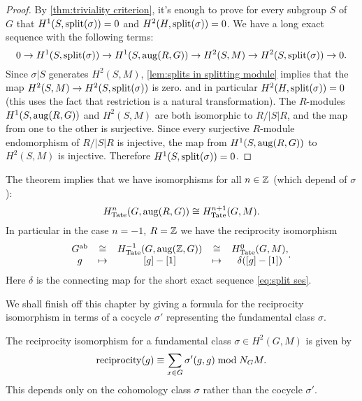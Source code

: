 \begin{proof}
	By \ref{thm:triviality criterion}, it's enough to prove for every subgroup $S$ of $G$ that
	$H^1(S,\mathrm{split}(\sigma))=0$ and $H^2(H,\mathrm{split}(\sigma))=0$.
	We have a long exact sequence with the following terms:
	\[
		0 \to H^1(S,\mathrm{split}(\sigma)) \to H^1(S,\mathrm{aug}(R,G)) \to H^2(S,M) \to H^2(S,\mathrm{split}(\sigma))
		\to 0.
	\]
	Since $\sigma|S$ generates $H^2(S,M)$, \ref{lem:splits in splitting module}
	implies that the map $H^2(S,M) \to H^2(S,\mathrm{split}(\sigma))$ is zero.
	and in particular $H^2(H,\mathrm{split}(\sigma))=0$ (this uses the fact that restriction is a natural
	transformation).
	The $R$-modules $H^1(S,\mathrm{aug}(R,G))$ and $H^2(S,M)$ are both isomorphic to $R / |S|R$,
	and the map from one to the other is surjective.
	Since every surjective $R$-module endomorphism of $R /|S|R$ is injective, the map
	from $H^1(S,\mathrm{aug}(R,G))$ to $H^2(S,M)$ is injective.
	Therefore $H^1(S,\mathrm{split}(\sigma))=0$.
\end{proof}

\begin{definition} \label{def:reciprocity iso}
	The theorem implies that we have isomorphisms for all $n\in {\mathbb Z}$ (which depend of $\sigma$):
	\[
		H^{n}_{\mathrm{Tate}}(G,\mathrm{aug}(R,G)) \cong H^{n+1}_{\mathrm{Tate}}(G,M) .
	\]
	In particular in the case $n = -1$, $R = {\mathbb Z}$ we have the reciprocity isomorphism
	\[
		\begin{matrix}
			G^{\mathrm{ab}} & \cong & H^{-1}_{\mathrm{Tate}}(G,\mathrm{aug}({\mathbb Z},G)) &\cong&  H^0_{\mathrm{Tate}}(G,M), \\
			g & \mapsto & [g] - [1] & \mapsto & \delta ([g] - [1])
		\end{matrix}.
	\]
	Here $\delta$ is the connecting map for the short exact sequence \ref{eq:split ses}.
\end{definition}

We shall finish off this chapter by giving a formula for the reciprocity isomorphism in terms of
a cocycle $\sigma'$ representing the fundamental class $\sigma$.

\begin{lemma} \label{lem:reciprocity formula}
	The reciprocity isomorphism for a fundamental class $\sigma \in H^2(G,M)$ is given by
	\[
		\mathrm{reciprocity}(g) \equiv  \sum_{x \in G} \sigma'(g,g) \bmod N_G M.
	\]
	This depends only on the cohomology class $\sigma$ rather than the cocycle $\sigma'$.
\end{lemma}

